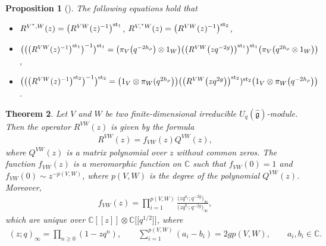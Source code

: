 \documentclass[10pt,a4paper]{amsart}
\numberwithin{equation}{section}
\newtheorem{Theorem}{Theorem}[section]
\newtheorem{Proposition}[Theorem]{Proposition}
 { \theoremstyle{definition}
\newtheorem{Definition}[Theorem]{Definition}
\newtheorem{Note}[Theorem]{Note}
\newtheorem{Example}[Theorem]{Example}
\newtheorem{Remark}[Theorem]{Remark} }
\begin{document}
\begin{Proposition}[{\cite[equations (2.30) and (2.32)]{MDGY}}]\label{R:V-W} The following equations hold that\samepage
\begin{itemize}\itemsep=0pt
\item[$(1)$] $R^{V^\ast, W}(z)=\bigl(R^{VW}(z)^{-1}\bigr)^{{\rm st}_1}$, $R^{V, ^\ast W}(z)=\bigl(R^{VW}(z)^{-1}\bigr)^{{\rm st}_2}$,
\item[$(2)$] $ \bigl(\bigl(\bigl(R^{VW}(z)^{-1}\bigr)^{{\rm st}_1}\bigr)^{-1}\bigr)^{{\rm st}_1}=\bigl(\pi_V\bigl(q^{-2h_\rho}\bigr)\otimes1_W\bigr)
\bigl(\bigl(R^{VW}\bigl(zq^{-2g}\bigr)\bigr)^{{\rm st}_1}\bigr)^{{\rm st}_1}\bigl(\pi_V\bigl(q^{2h_\rho}\otimes1_W\bigr)\bigr)$,
\item[$(3)$] $ \bigl(\bigl(\bigl(R^{VW}(z)^{-1}\bigr)^{{\rm st}_2}\bigr)^{-1}\bigr)^{{\rm st}_2}=\bigl(1_V\otimes\pi_W(q^{2h_\rho}\bigr)\bigr)
\bigl(\bigl(R^{VW}\bigl(zq^{2g}\bigr)\bigr)^{{\rm st}_2})^{{\rm st}_2}\bigl(1_V\otimes\pi_W\bigl(q^{-2h_\rho}\bigr)\bigr)$.
\end{itemize}
\end{Proposition}

\begin{Theorem}\label{RVWQVW}
Let $V$ and $W$ be two finite-dimensional irreducible $U_q(\mathfrak{\hat{g}})$-module. Then the operator $R^{VW}(z)$ is given by the formula
\begin{gather}\label{formu1}
 R^{VW}(z)=f_{VW}(z)Q^{VW}(z),
\end{gather}where $Q^{VW}(z)$ is a matrix polynomial over $z$ without common zeros. The function $f_{VW}(z)$ is a meromorphic function on $\mathbb{C}$ such that $f_{VW}(0)=1$ and $f_{VW}(0)\sim z^{-p(V,W)}$, where $p(V,W)$ is the degree of the polynomial $Q^{VW}(z)$. Moreover,
\begin{gather}\label{formu2}
 f_{VW}(z)=\prod\limits_{i=1}^{p(V,W)}\frac{\bigl(zq^{a_i}; q^{-2g}\bigr)_\infty}{\bigl(zq^{b_i}; q^{-2g}\bigr)_\infty},
\end{gather}
which are unique over $\mathbb{C}[[z]]\otimes\mathbb{C}\bigl[\bigl[q^{1/2}\bigr]\bigr]$, where
\begin{gather*}
 (z; q)_\infty=\prod\limits_{n\geq0}(1-zq^n), \qquad \sum_{i=1}^{p(V,W)}(a_i-b_i)=2gp(V,W),\qquad a_i, b_i\in\mathbb{C}.
\end{gather*}
\end{Theorem}
\end{document}
